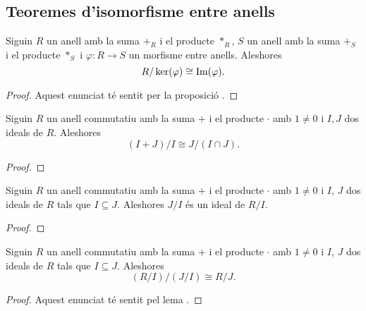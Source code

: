 \documentclass[../Apunts.tex]{subfiles}
\begin{document}
	\subsection{Teoremes d'isomorfisme entre anells} %
	\begin{theorem}
		\label{thm:Primer Teorema de l'isomorfisme entre anells}
		Siguin \(R\) un anell amb la suma \(+_{R}\) i el producte \(\ast_{R}\), \(S\) un anell amb la suma \(+_{S}\) i el producte \(\ast_{S}\) i \(\varphi\colon R\longrightarrow S\) un morfisme entre anells. Aleshores
		\[R/\operatorname*{ker}(\varphi)\cong\operatorname*{Im}(\varphi).\]
		\begin{proof}
			Aquest enunciat té sentit per la proposició . %
		\end{proof}
	\end{theorem}
	\begin{theorem}
		\label{thm:Segon Teorema de l'isomorfisme entre anells}
		Siguin \(R\) un anell commutatiu amb la suma \(+\) i el producte \(\cdot\) amb \(1\neq0\) i \(I,J\) dos ideals de \(R\). Aleshores
		\[(I+J)/I\cong J/(I\cap J).\]
		\begin{proof}
		\end{proof}
	\end{theorem}
	\begin{lemma}
		\label{lema:Tercer Teorema de l'isomorfisme entre anells}
		Siguin \(R\) un anell commutatiu amb la suma \(+\) i el producte \(\cdot\) amb \(1\neq0\) i \(I\), \(J\) dos ideals de \(R\) tals que \(I\subseteq J\). Aleshores \(J/I\) és un ideal de \(R/I\). %
		\begin{proof}
		\end{proof}
	\end{lemma}
	\begin{theorem}
		\label{thm:Tercer Teorema de l'isomorfisme entre anells}
		Siguin \(R\) un anell commutatiu amb la suma \(+\) i el producte \(\cdot\) amb \(1\neq0\) i \(I\), \(J\) dos ideals de \(R\) tals que \(I\subseteq J\). Aleshores
		\[(R/I)/(J/I)\cong R/J.\]
		\begin{proof}
			Aquest enunciat té sentit pel lema . %
		\end{proof}
	\end{theorem}
\end{document}
